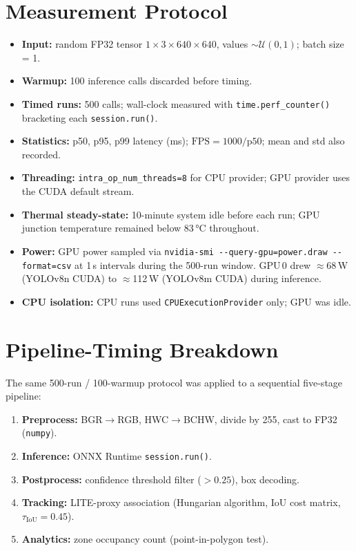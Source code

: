 \documentclass[11pt,a4paper]{article}
\begin{document}
	\section{Measurement Protocol}
	\label{sec:measurement}
	\begin{itemize}[leftmargin=*, noitemsep]
		\item \textbf{Input:} random FP32 tensor $1\times3\times640\times640$,
		values $\sim\mathcal{U}(0,1)$; batch size = 1.
		\item \textbf{Warmup:} 100 inference calls discarded before timing.
		\item \textbf{Timed runs:} 500 calls; wall-clock measured with
		\texttt{time.perf\_counter()} bracketing each \texttt{session.run()}.
		\item \textbf{Statistics:} p50, p95, p99 latency (ms);
		$\mathrm{FPS} = 1000 / \mathrm{p50}$; mean and std also recorded.
		\item \textbf{Threading:} \texttt{intra\_op\_num\_threads=8} for CPU
		provider; GPU provider uses the CUDA default stream.
		\item \textbf{Thermal steady-state:} 10-minute system idle before each
		run; GPU junction temperature remained below 83\,°C throughout.
		\item \textbf{Power:} GPU power sampled via
		\texttt{nvidia-smi -{}-query-gpu=power.draw -{}-format=csv}
		at 1\,s intervals during the 500-run window.
		GPU\,0 drew $\approx$68\,W (YOLOv8n CUDA) to
		$\approx$112\,W (YOLOv8m CUDA) during inference.
		\item \textbf{CPU isolation:} CPU runs used
		\texttt{CPUExecutionProvider} only; GPU was idle.
	\end{itemize}
	
	\section{Pipeline-Timing Breakdown}
	
	The same 500-run / 100-warmup protocol was applied to a sequential
	five-stage pipeline:
	
	\begin{enumerate}[leftmargin=*, noitemsep]
		\item \textbf{Preprocess:} BGR$\to$RGB, HWC$\to$BCHW,
		divide by 255, cast to FP32 (\texttt{numpy}).
		\item \textbf{Inference:} ONNX Runtime \texttt{session.run()}.
		\item \textbf{Postprocess:} confidence threshold filter ($> 0.25$),
		box decoding.
		\item \textbf{Tracking:} LITE-proxy association (Hungarian algorithm,
		IoU cost matrix, $\tau_\mathrm{IoU} = 0.45$).
		\item \textbf{Analytics:} zone occupancy count
		(point-in-polygon test).
	\end{enumerate}
	
\end{document}
